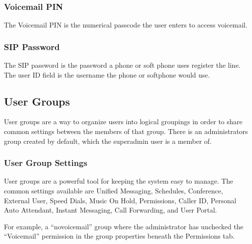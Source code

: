 \documentclass[letterpaper,10pt,english]{sphinxmanual}
\begin{document}
\subsubsection{Voicemail PIN}
\label{\detokenize{webui:voicemail-pin}}
The Voicemail PIN is the numerical passcode the user enters to access voicemail.


\subsubsection{SIP Password}
\label{\detokenize{webui:sip-password}}
The SIP password is the password a phone or soft phone uses register the line. The user ID field is the username the phone or softphone would use.


\subsection{User Groups}
\label{\detokenize{webui:user-groups}}\label{\detokenize{webui:id3}}
User groups are a way to organize users into logical groupings in order to share common settings between the members of that group. There is an administrators group created by default, which the superadmin user is a member of.
\begin{quote}

\end{quote}


\subsubsection{User Group Settings}
\label{\detokenize{webui:user-group-settings}}
User groups are a powerful tool for keeping the system easy to manage. The common settings available are Unified Messaging, Schedules, Conference, External User, Speed Dials, Music On Hold, Permissions, Caller ID, Personal Auto Attendant, Instant Messaging, Call Forwarding, and User Portal.
\begin{quote}

\end{quote}

For example, a “novoicemail” group where the administrator has unchecked the “Voicemail” permission in the group properties beneath the Permissions tab.
\end{document}
